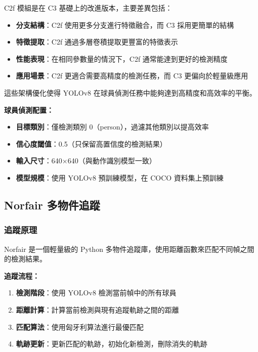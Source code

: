 \documentclass[a4paper,14pt,oneside]{article}
\begin{document}
C2f 模組是在 C3 基礎上的改進版本，主要差異包括：

\begin{itemize}
    \item \textbf{分支結構}：C2f 使用更多分支進行特徵融合，而 C3 採用更簡單的結構
    \item \textbf{特徵提取}：C2f 通過多層卷積提取更豐富的特徵表示
    \item \textbf{性能表現}：在相同參數量的情況下，C2f 通常能達到更好的檢測精度
    \item \textbf{應用場景}：C2f 更適合需要高精度的檢測任務，而 C3 更偏向於輕量級應用
\end{itemize}

這些架構優化使得 YOLOv8 在球員偵測任務中能夠達到高精度和高效率的平衡。

\textbf{球員偵測配置：}

\begin{itemize}
    \item \textbf{目標類別}：僅檢測類別 0（person），過濾其他類別以提高效率
    \item \textbf{信心度閾值}：0.5（只保留高置信度的檢測結果）
    \item \textbf{輸入尺寸}：640×640（與動作識別模型一致）
    \item \textbf{模型規模}：使用 YOLOv8 預訓練模型，在 COCO 資料集上預訓練
\end{itemize}

\subsection{Norfair 多物件追蹤}

\subsubsection{追蹤原理}

Norfair 是一個輕量級的 Python 多物件追蹤庫，使用距離函數來匹配不同幀之間的檢測結果。

\textbf{追蹤流程：}

\begin{enumerate}
    \item \textbf{檢測階段}：使用 YOLOv8 檢測當前幀中的所有球員
    \item \textbf{距離計算}：計算當前檢測與現有追蹤軌跡之間的距離
    \item \textbf{匹配算法}：使用匈牙利算法進行最優匹配
    \item \textbf{軌跡更新}：更新匹配的軌跡，初始化新檢測，刪除消失的軌跡
\end{enumerate}
\end{document}
